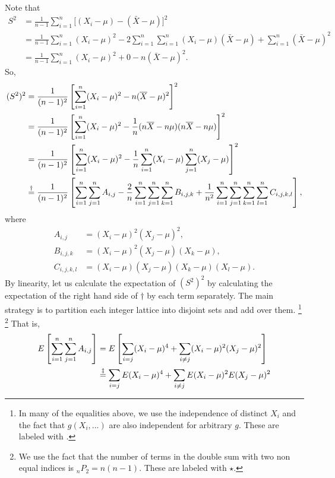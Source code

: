 \documentclass{homework}
\begin{document}
  \begin{solution}
  Note that
  \begin{align*}
  S^2 &=\frac{1}{n-1}\sum_{i=1}^n\Big[(X_i-\mu) - (\bar X - \mu)\Big]^2\\
      &=\frac{1}{n-1}\sum_{i=1}^n(X_i- \mu)^2 - 2 \sum_{i=1}^n \sum_{i=1}^n(X_i - \mu)(\bar X - \mu) + \sum_{i=1}^n  (\bar X - \mu)^2\\
      &=\frac{1}{n-1}\sum_{i=1}^n(X_i- \mu)^2 + 0 - n(\bar X - \mu)^2.
  \end{align*}
  So,
  \begin{align}
  (S^2)^2 
    &=\frac{1}{(n-1)^2}\left[\sum_{i=1}^n(X_i- \mu)^2 - n(\overline X - \mu)^2\right]^2\nonumber\\
    &=\frac{1}{(n-1)^2}\left[\sum_{i=1}^n(X_i- \mu)^2 - \frac 1n (n \overline X - n \mu)(n \overline X - n\mu)\right]^2\nonumber\\
    &=\frac{1}{(n-1)^2}\left[\sum_{i=1}^n(X_i- \mu)^2 - \frac 1n \sum_{i=1}^n(X_i - \mu)\sum_{j=1}^n(X_j - \mu)\right]^2 \label{ssquare}\\
    &\stackrel{\dagger}{=}\frac{1}{(n-1)^2}\left[\sum_{i=1}^n\sum_{j=1}^n A_{i,j} - \frac 2n \sum_{i=1}^n\sum_{j=1}^n\sum_{k=1}^n B_{i,j,k} + \frac 1{n^2}\sum_{i=1}^n\sum_{j=1}^n\sum_{k=1}^n\sum_{l=1}^n C_{i,j,k,l}\right],\nonumber
  \end{align}
  where 
  \begin{align*}
    A_{i,j}  &= (X_i- \mu)^2(X_j-\mu)^2,\\ 
    B_{i,j,k} &= (X_i - \mu)^2(X_j - \mu)(X_k - \mu),\\
    C_{i,j,k,l} &= (X_i - \mu)(X_j - \mu)(X_k - \mu)(X_l - \mu).
  \end{align*}
  By linearity, let us calculate the expectation of $(S^2)^2$ by calculating the expectation of the right hand side of $\dagger$ by each term separately. The main strategy is to partition each integer lattice into disjoint sets and add over them.  \footnote{In many of the equalities above, we use the independence of distinct $X_i$ and the fact that $g(X_i,...)$ are also independent for arbitrary $g$. These are labeled with \textdaggerdbl.} \footnote{ We use the fact that the number of terms in the double sum with two non equal indices is $_nP_2 = n(n-1)$. These are labeled with $\star$.} That is,
  \begin{align*}
    E\left[\ssum A_{i,j}\right] 
    &= E\left[\sum_{i=j} (X_i-\mu)^4 + \sum_{i\not=j}(X_i-\mu)^2(X_j-\mu)^2\right]\\
    &\stackrel{\ddagger}{=} \sum_{i=j} E(X_i-\mu)^4 + \sum_{i\not=j}E(X_i-\mu)^2E(X_j-\mu)^2\\

\end{align*}
\end{solution}
\end{document}
